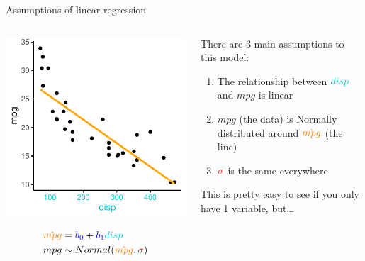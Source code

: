 \documentclass[
  ignorenonframetext,
  aspectratio=169]{beamer}
\providecommand{\tightlist}{%
  \setlength{\itemsep}{0pt}\setlength{\parskip}{0pt}}
\begin{document}
\begin{frame}{Assumptions of linear regression}
\protect\hypertarget{assumptions-of-linear-regression}{}
\begin{columns}[T]
\begin{column}{0.48\textwidth}
\includegraphics{03-Lecture_files/figure-beamer/unnamed-chunk-24-1.pdf}

\begin{equation*} 
\begin{split}
\textcolor{orange}{\hat{mpg}} & = \textcolor{blue}{b_0} + \textcolor{blue}{b_1}\textcolor{darkturquoise}{disp} \\
mpg & \sim Normal(\textcolor{orange}{\hat{mpg}},\textcolor{red}{\sigma})
\end{split}
\end{equation*}
\end{column}

\begin{column}{0.48\textwidth}
There are 3 main assumptions to this model:

\begin{enumerate}[<+->]
\tightlist
\item
  The relationship between \(\textcolor{darkturquoise}{disp}\) and
  \(mpg\) is linear
\item
  \(mpg\) (the data) is Normally distributed around
  \(\textcolor{orange}{\hat{mpg}}\) (the line)
\item
  \(\textcolor{red}{\sigma}\) is the same everywhere
\end{enumerate}

This is pretty easy to see if you only have 1 variable, but\ldots{}
\end{column}
\end{columns}
\end{frame}
\end{document}
